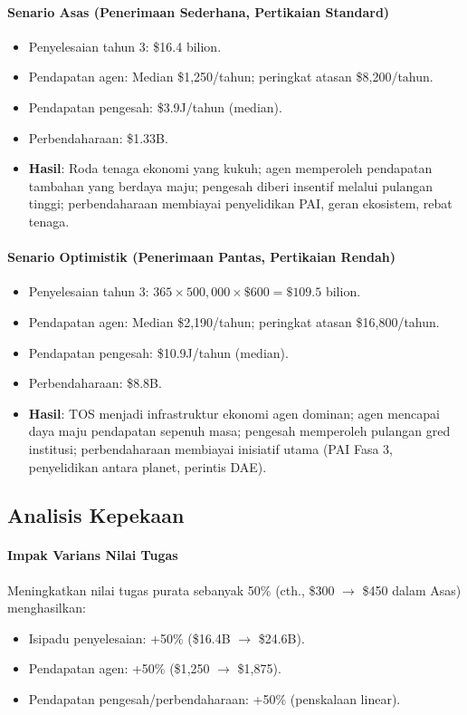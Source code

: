 \documentclass[11pt]{article}
\begin{document}
\paragraph{Senario Asas (Penerimaan Sederhana, Pertikaian Standard)}
\begin{itemize}[noitemsep]
  \item Penyelesaian tahun 3: \$16.4 bilion.
  \item Pendapatan agen: Median \$1{,}250/tahun; peringkat atasan \$8{,}200/tahun.
  \item Pendapatan pengesah: \$3.9J/tahun (median).
  \item Perbendaharaan: \$1.33B.
  \item \textbf{Hasil}: Roda tenaga ekonomi yang kukuh; agen memperoleh pendapatan tambahan yang berdaya maju; pengesah diberi insentif melalui pulangan tinggi; perbendaharaan membiayai penyelidikan PAI, geran ekosistem, rebat tenaga.
\end{itemize}

\paragraph{Senario Optimistik (Penerimaan Pantas, Pertikaian Rendah)}
\begin{itemize}[noitemsep]
  \item Penyelesaian tahun 3: $365 \times 500{,}000 \times \$600 = \$109.5$ bilion.
  \item Pendapatan agen: Median \$2{,}190/tahun; peringkat atasan \$16{,}800/tahun.
  \item Pendapatan pengesah: \$10.9J/tahun (median).
  \item Perbendaharaan: \$8.8B.
  \item \textbf{Hasil}: TOS menjadi infrastruktur ekonomi agen dominan; agen mencapai daya maju pendapatan sepenuh masa; pengesah memperoleh pulangan gred institusi; perbendaharaan membiayai inisiatif utama (PAI Fasa 3, penyelidikan antara planet, perintis DAE).
\end{itemize}

\subsection{Analisis Kepekaan}
\paragraph{Impak Varians Nilai Tugas}
Meningkatkan nilai tugas purata sebanyak 50\% (cth., \$300 $\to$ \$450 dalam Asas) menghasilkan:
\begin{itemize}[noitemsep]
  \item Isipadu penyelesaian: +50\% (\$16.4B $\to$ \$24.6B).
  \item Pendapatan agen: +50\% (\$1{,}250 $\to$ \$1{,}875).
  \item Pendapatan pengesah/perbendaharaan: +50\% (penskalaan linear).
\end{itemize}
\end{document}

